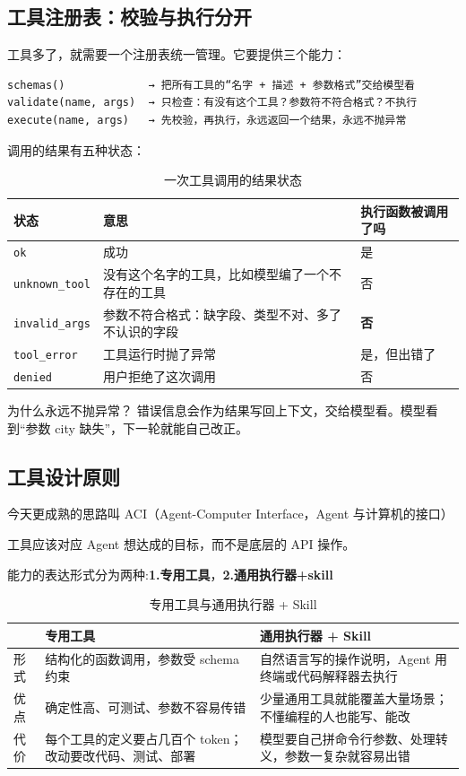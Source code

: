 \subsection{工具注册表：校验与执行分开}
工具多了，就需要一个注册表统一管理。它要提供三个能力：
\begin{lstlisting}[style=agentpython]
schemas()             → 把所有工具的“名字 + 描述 + 参数格式”交给模型看
validate(name, args)  → 只检查：有没有这个工具？参数符不符合格式？不执行
execute(name, args)   → 先校验，再执行，永远返回一个结果，永远不抛异常
\end{lstlisting}
调用的结果有五种状态：
\begin{table}[H]
\centering
\caption{一次工具调用的结果状态}
\label{tab:tool-status}
\begin{tabular}{p{3.2cm} p{7.5cm} p{4cm}}
  \toprule
  状态 & 意思 & 执行函数被调用了吗 \\
  \midrule
  \texttt{ok}           & 成功 & 是 \\
  \texttt{unknown\_tool} & 没有这个名字的工具，比如模型编了一个不存在的工具 & 否 \\
  \texttt{invalid\_args} & 参数不符合格式：缺字段、类型不对、多了不认识的字段 & \textbf{否} \\
  \texttt{tool\_error}   & 工具运行时抛了异常 & 是，但出错了 \\
  \texttt{denied}        & 用户拒绝了这次调用 & 否\\
  \bottomrule
\end{tabular}
\end{table}

为什么永远不抛异常？ 错误信息会作为结果写回上下文，交给模型看。模型看到“参数 city 缺失”，下一轮就能自己改正。
\subsection{工具设计原则}
今天更成熟的思路叫 ACI（Agent-Computer Interface，Agent 与计算机的接口）
\begin{tcolorbox}[colback=second!5, colframe=second, title=ACI原则]
  工具应该对应 Agent 想达成的目标，而不是底层的 API 操作。
\end{tcolorbox}
能力的表达形式分为两种:\textbf{1.专用工具}，\textbf{2.通用执行器+skill}
\begin{table}[H]
\centering
\caption{专用工具与通用执行器 + Skill}
\label{tab:tool-forms}
\begin{tabular}{p{1.6cm} p{6.4cm} p{6.6cm}}
  \toprule
   & 专用工具 & 通用执行器 + Skill \\
  \midrule
  形式 & 结构化的函数调用，参数受 schema 约束 & 自然语言写的操作说明，Agent 用终端或代码解释器去执行 \\
  优点 & 确定性高、可测试、参数不容易传错 & 少量通用工具就能覆盖大量场景；不懂编程的人也能写、能改 \\
  代价 & 每个工具的定义要占几百个 token；改动要改代码、测试、部署 & 模型要自己拼命令行参数、处理转义，参数一复杂就容易出错 \\
  \bottomrule
\end{tabular}
\end{table}

